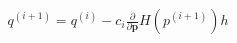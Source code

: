 \documentclass[preview]{standalone}
\begin{document}
\begin{align*}
q^{(i+1)}=q^{(i)}-c_i\frac{\partial}{\partial\mathbf p}H(p^{(i+1)})h
\end{align*}
\end{document}
